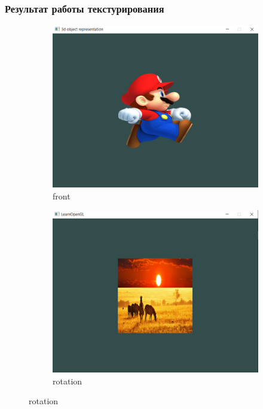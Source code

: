 \documentclass[12pt]{article}
\begin{document}
    \subsubsection{Результат работы текстурирования}
    \begin{figure}[!h]
        \begin{subfigure}{.5\textwidth}
          \centering
          \includegraphics[width=.95\linewidth]{images/shaders_result.png}
          \caption{front}
          \label{fig:sfig3}
        \end{subfigure}%
        \begin{subfigure}{.5\textwidth}
          \centering
          \includegraphics[width=.95\linewidth]{images/texture_res.png}
          \caption{rotation}
          \label{fig:sfig4}
        \end{subfigure}
    \end{figure}
\end{document}
